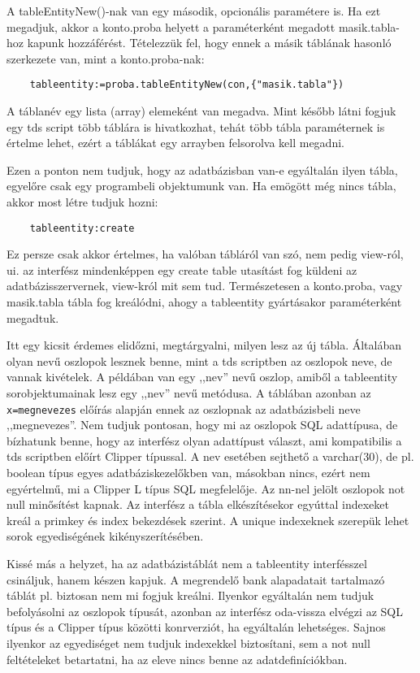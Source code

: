 A tableEntityNew()-nak van egy második, opcionális paramétere is.
Ha ezt megadjuk, akkor a konto.proba helyett a paraméterként
megadott masik.tabla-hoz kapunk hozzáférést. Tételezzük fel,
hogy ennek a másik táblának hasonló szerkezete van, mint a konto.proba-nak:
\begin{verbatim}
    tableentity:=proba.tableEntityNew(con,{"masik.tabla"})
\end{verbatim}
A táblanév egy lista (array) elemeként van megadva. Mint később
látni fogjuk egy tds script több táblára is hivatkozhat,
tehát több tábla paraméternek is értelme lehet, ezért a
táblákat egy arrayben felsorolva kell megadni.

Ezen a ponton nem tudjuk, hogy az adatbázisban van-e egyáltalán
ilyen tábla, egyelőre csak egy programbeli objektumunk van.
Ha emögött még nincs tábla, akkor most létre tudjuk hozni:
\begin{verbatim}
    tableentity:create
\end{verbatim}
Ez persze csak akkor értelmes, ha valóban tábláról van szó,
nem pedig view-ról, ui. az interfész mindenképpen egy
create table utasítást fog küldeni az adatbázisszervernek,
view-król mit sem tud. Természetesen a konto.proba,
vagy masik.tabla tábla fog kreálódni, ahogy a tableentity
gyártásakor paraméterként megadtuk. 

Itt egy kicsit érdemes elidőzni,
megtárgyalni, milyen lesz az új tábla. Általában olyan nevű
oszlopok lesznek benne, mint a tds scriptben az oszlopok neve,
de vannak kivételek. A  példában van egy ,,nev'' nevű oszlop,
amiből a tableentity sorobjektumainak lesz egy ,,nev'' nevű metódusa. 
A táblában azonban az \verb!x=megnevezes! előírás
alapján ennek az oszlopnak az adatbázisbeli neve ,,megnevezes''.
Nem tudjuk pontosan, hogy mi az oszlopok SQL adattípusa,
de bízhatunk benne, hogy az interfész olyan
adattípust választ, ami kompatibilis a tds scriptben
előírt Clipper típussal. A nev esetében sejthető a varchar(30),
de pl. boolean típus egyes adatbáziskezelőkben van, másokban
nincs, ezért nem egyértelmű, mi a Clipper L típus SQL megfelelője.
Az nn-nel jelölt oszlopok not null minősítést kapnak.
Az interfész a tábla elkészítésekor egyúttal indexeket kreál
a primkey és index bekezdések szerint. A unique indexeknek 
szerepük lehet sorok egyediségének kikényszerítésében.

Kissé más a helyzet, ha az adatbázistáblát nem a tableentity 
interfésszel csináljuk, hanem készen kapjuk. A megrendelő bank 
alapadatait tartalmazó táblát pl. biztosan nem mi fogjuk kreálni. 
Ilyenkor egyáltalán nem tudjuk befolyásolni az oszlopok típusát, 
azonban az interfész oda-vissza elvégzi az SQL típus és a Clipper 
típus közötti konrverziót, ha egyáltalán lehetséges. Sajnos ilyenkor
az egyediséget nem tudjuk indexekkel biztosítani, sem a not null
feltételeket betartatni, ha az eleve nincs benne az adatdefiníciókban.

